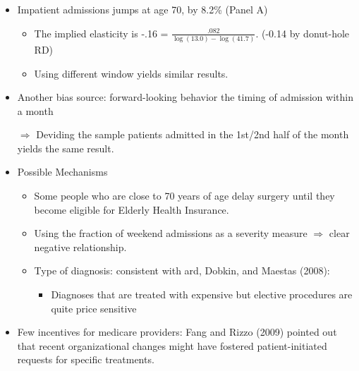 \documentclass[../root]{subfiles}
\begin{document}
    \begin{itemize}
      \item Impatient admissions jumps at age 70, by 8.2\% (Panel A)
      \begin{itemize}
        \item The implied elasticity is -.16 = $\frac{.082}{\log(13.0) - \log(41.7)}$. (-0.14 by donut-hole RD)
        \item Using different window yields similar results.
      \end{itemize}
      \item Another bias source: forward-looking behavior the timing of admission within a month

      $\Rightarrow$ Deviding the sample patients admitted in the 1st/2nd half of the month yields the same result.
      \item Possible Mechanisms
      \begin{itemize}
        \item Some people who are close to 70 years of age delay surgery until they become eligible for Elderly Health Insurance.
        \item Using the fraction of weekend admissions as a severity measure $\Rightarrow$ clear negative relationship.
        \item Type of diagnosis: consistent with ard, Dobkin, and Maestas (2008):
        \begin{itemize}
          \item Diagnoses that are treated with expensive but elective procedures are quite price sensitive
        \end{itemize}
      \end{itemize}
      \item Few incentives for medicare providers: Fang and Rizzo (2009) pointed out that recent organizational changes might have fostered patient-initiated requests for specific treatments.
    \end{itemize}
\end{document}
